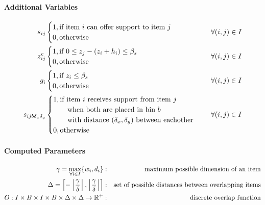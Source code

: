 \paragraph*{Additional Variables}
\begin{eqnarray*}
        s_{ij} & \begin{cases}
                        1, \text{if item $i$ can offer support to item $j$} \\ 
                        0, \text{otherwise}
                    \end{cases} & \forall (i,j) \in I \\
        z^c_{ij} & \begin{cases}
                        1, \text{if $ 0 \le z_j - (z_i + h_i) \le \beta_s$ } \\ 
                        0, \text{otherwise}
                    \end{cases} & \forall (i,j) \in I \\
        g_i & \begin{cases}
                        1, \text{if $z_i \le \beta_s$ } \\ 
                        0, \text{otherwise}
                    \end{cases} & \forall (i,j) \in I \\
        s_{i j b \delta_x \delta_y} & \begin{cases}
                    1, \text{if item $i$ receives support from item $j$} \\ \qquad \text{when both are placed in bin $b$} \\ \qquad \text{with distance $(\delta_x, \delta_y)$ between eachother } \\ 
                    0, \text{otherwise}
                \end{cases} & \forall (i,j) \in I
\end{eqnarray*}


\paragraph*{Computed Parameters}
\begin{eqnarray}
    \gamma = \max_{\forall i \in I}\{ w_i, d_i \}  &:& \text{maximum possible dimension of an item} \notag \\
    \Delta =  \left[ - \left\lfloor \frac{ \gamma }{\delta} \right\rfloor, \left\lfloor \frac{ \gamma }{\delta} \right\rfloor \right]  &:& \text{set of possible distances between overlapping items} \notag \\
    O : I \times B \times I \times B \times \Delta \times \Delta \rightarrow \mathbb{R}^+ &:& \text{discrete overlap function} \label{eq:overlap_function}
\end{eqnarray}

